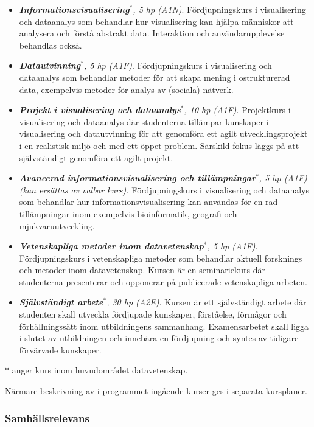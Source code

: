 \begin{itemize}
\tightlist
\item
  \emph{\textbf{Informationsvisualisering}$^*$, 5 hp (A1N)}.
  Fördjupningskurs i visualisering och dataanalys som behandlar hur
  visualisering kan hjälpa människor att analysera och förstå abstrakt
  data. Interaktion och användarupplevelse behandlas också.
\item
  \emph{\textbf{Datautvinning}$^*$, 5 hp (A1F)}. Fördjupningskurs i
  visualisering och dataanalys som behandlar metoder för att skapa
  mening i ostrukturerad data, exempelvis metoder för analys av (sociala)
  nätverk.
\item
  \emph{\textbf{Projekt i visualisering och dataanalys}$^*$, 10 hp (A1F)}.
  Projektkurs i visualisering och dataanalys där studenterna tillämpar
  kunskaper i visualisering och datautvinning för att genomföra
  ett agilt utvecklingsprojekt i en realistisk miljö och med ett öppet
  problem. Särskild fokus läggs på att självständigt genomföra ett agilt
  projekt.
\item
  \emph{\textbf{Avancerad informationsvisualisering och tillämpningar}$^*$,
  5 hp (A1F) (kan ersättas av valbar kurs).} Fördjupningskurs i
  visualisering och dataanalys som behandlar hur
  informationsvisualisering kan användas för en rad tillämpningar 
  inom exempelvis bioinformatik, geografi och mjukvaruutveckling.
\item
  \emph{\textbf{Vetenskapliga metoder inom datavetenskap}$^*$, 5 hp (A1F)}.
  Fördjupningskurs i vetenskapliga metoder som behandlar aktuell
  forsknings och metoder inom datavetenskap. Kursen är en seminariekurs
  där studenterna presenterar och opponerar på publicerade vetenskapliga
  arbeten.
\item
  \emph{\textbf{Självständigt arbete}$^*$, 30 hp (A2E)}. Kursen är ett
  självständigt arbete där studenten skall utveckla fördjupade
  kunskaper, förståelse, förmågor och förhållningssätt inom
  utbildningens sammanhang. Examensarbetet skall ligga i slutet av
  utbildningen och innebära en fördjupning och syntes av tidigare
  förvärvade kunskaper.
\end{itemize}

$*$ anger kurs inom huvudområdet datavetenskap.

Närmare beskrivning av i programmet ingående kurser ges i separata
kursplaner.

\subsubsection*{Samhällsrelevans}

